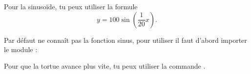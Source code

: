 \documentclass[11pt,class=report,crop=false]{standalone}
\begin{document}
\begin{activite}
Pour la sinuso\"ide, tu peux utiliser la formule 
$$y = 100\sin\left(\frac{1}{20}x\right).$$
  
Par défaut \Python{} ne connaît pas la fonction sinus, pour utiliser  il faut d'abord importer le module  :

Pour que la tortue avance plus vite, tu peux utiliser la commande .
\end{activite}




\begin{activite}




\end{activite}
\end{document}
